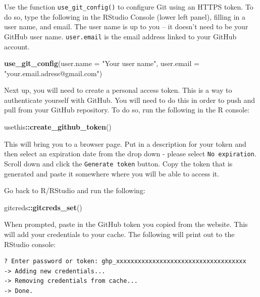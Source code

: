 \documentclass[
]{book}
\newenvironment{Shaded}{\begin{snugshade}}{\end{snugshade}}
\newcommand{\AttributeTok}[1]{\textcolor[rgb]{0.13,0.29,0.53}{#1}}
\newcommand{\FunctionTok}[1]{\textcolor[rgb]{0.13,0.29,0.53}{\textbf{#1}}}
\newcommand{\NormalTok}[1]{#1}
\newcommand{\SpecialCharTok}[1]{\textcolor[rgb]{0.81,0.36,0.00}{\textbf{#1}}}
\newcommand{\StringTok}[1]{\textcolor[rgb]{0.31,0.60,0.02}{#1}}
\begin{document}
Use the function \texttt{use\_git\_config()} to configure Git using an HTTPS token. To
do so, type the following in the RStudio Console (lower left panel), filling in
a user name, and email. The user name is up to you -- it doesn't need to be your
GitHub user name. \texttt{user.email} is the email address linked to your GitHub
account.

\begin{Shaded}
\begin{Highlighting}[]
\FunctionTok{use\_git\_config}\NormalTok{(}\AttributeTok{user.name =} \StringTok{"Your user name"}\NormalTok{,}
               \AttributeTok{user.email =} \StringTok{"your.email.adress@gmail.com"}\NormalTok{)}
\end{Highlighting}
\end{Shaded}

Next up, you will need to create a personal access token. This is a way to
authenticate yourself with GitHub. You will need to do this in order to push and
pull from your GitHub repository. To do so, run the following in the R console:

\begin{Shaded}
\begin{Highlighting}[]
\NormalTok{usethis}\SpecialCharTok{::}\FunctionTok{create\_github\_token}\NormalTok{()  }
\end{Highlighting}
\end{Shaded}

This will bring you to a browser page. Put in a description for your token and
then select an expiration date from the drop down - please select \texttt{No\ expiration}.
Scroll down and click the \texttt{Generate\ token} button. Copy the token that is
generated and paste it somewhere where you will be able to access it.

Go back to R/RStudio and run the following:

\begin{Shaded}
\begin{Highlighting}[]
\NormalTok{gitcreds}\SpecialCharTok{::}\FunctionTok{gitcreds\_set}\NormalTok{()}
\end{Highlighting}
\end{Shaded}

When prompted, paste in the GitHub token you copied from the website. This will
add your credentials to your cache. The following will print out to the RStudio
console:

\begin{verbatim}
? Enter password or token: ghp_xxxxxxxxxxxxxxxxxxxxxxxxxxxxxxxxxxxx  
-> Adding new credentials...
-> Removing credentials from cache...
-> Done.
\end{verbatim}
\end{document}

